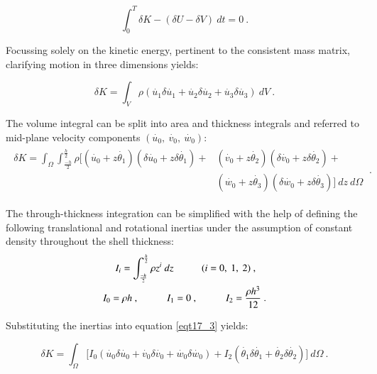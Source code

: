 \begin{equation} 
\int_{0}^{T} \delta K - (\delta U - \delta V) \ dt = 0
\label{eqt17_1}\ .
\end{equation}

Focussing solely on the kinetic energy, pertinent to the consistent mass matrix, clarifying motion in three dimensions yields:

\begin{equation} 
\delta K = \int_{V} \rho 
(
\dot{u_1} \delta \dot{u_1} + 
\dot{u_2} \delta \dot{u_2} + 
\dot{u_3} \delta \dot{u_3}
)
\ dV
\label{eqt17_2}\ .
\end{equation}

The volume integral can be split into area and thickness integrals and referred to mid-plane velocity components $(\dot{u_0},\ \dot{v_0},\ \dot{w_0})$:
\begin{gather} 
	\begin{aligned}
		\delta K = \int_{\Omega} \int_{\frac{-h}{2}}^{\frac{h}{2}} \rho 
		\Big[
		(\dot{u_0} + z\dot{\theta_1})  (\delta \dot{u_0} + z\delta\dot{\theta_1})+ 
		&(\dot{v_0} + z\dot{\theta_2})  (\delta \dot{v_0} + z\delta\dot{\theta_2})+
		\\
		&(\dot{w_0} + z\dot{\theta_3})  (\delta \dot{w_0} + z\delta\dot{\theta_3})
		\Big]
		\ dz
		\ d\Omega
		\label{eqt17_3}
	\end{aligned}\ .
\end{gather}

The through-thickness integration can be simplified with the help of defining the following translational and rotational inertias under the assumption of constant density throughout the shell thickness:
\begin{gather} 
	\begin{aligned}
		&\ \ \ \ \ 
		I_i = \int_{\frac{-h}{2}}^{\frac{h}{2}} \rho 
		z^i
		\ dz
		\hspace{10mm}
		(i = 0,\ 1,\ 2)\ ,
		\\
		&I_0 = \rho h\ ,
		\hspace{10mm}
		I_1 = 0\ ,
		\hspace{10mm}
		I_2 = \frac{\rho h^3}{12}
		\label{eqt17_4}\ .
	\end{aligned}
\end{gather}

Substituting the inertias into equation \ref{eqt17_3} yields:

\begin{equation} 
	\delta K = \int_{\Omega} 
	\Big[I_0
	(\dot{u_0} \delta \dot{u_0} 
	+ \dot{v_0} \delta \dot{v_0}
	+ \dot{w_0} \delta \dot{w_0}
	)  
	+
	I_2
	(\dot{\theta_1} \delta \dot{\theta_1} 
	+ \dot{\theta_2} \delta \dot{\theta_2} 
	)  
	\Big]
	\ d\Omega
	\label{eqt17_5}\ .
\end{equation}

